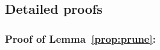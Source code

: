 \documentclass[Afour,sageh,times]{sagej}
\newcommand{\autop}{\ccalA_{\phi}}
\begin{document}
{{\subsection{Detailed proofs}\label{app:proofforproof}
\subsubsection{Proof of Lemma~\ref{prop:prune}:}\label{app:prune}


}}
\end{document}
